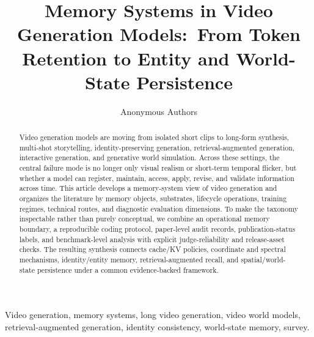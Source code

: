 \documentclass[journal]{IEEEtran}
\title{Memory Systems in Video Generation Models:\ From Token Retention to Entity and World-State Persistence}
\author{Anonymous Authors}
\begin{document}
\maketitle

\begin{abstract}
Video generation models are moving from isolated short clips to long-form synthesis, multi-shot storytelling, identity-preserving generation, retrieval-augmented generation, interactive generation, and generative world simulation. Across these settings, the central failure mode is no longer only visual realism or short-term temporal flicker, but whether a model can register, maintain, access, apply, revise, and validate information across time. This article develops a memory-system view of video generation and organizes the literature by memory objects, substrates, lifecycle operations, training regimes, technical routes, and diagnostic evaluation dimensions. To make the taxonomy inspectable rather than purely conceptual, we combine an operational memory boundary, a reproducible coding protocol, paper-level audit records, publication-status labels, and benchmark-level analysis with explicit judge-reliability and release-asset checks. The resulting synthesis connects cache/KV policies, coordinate and spectral mechanisms, identity/entity memory, retrieval-augmented recall, and spatial/world-state persistence under a common evidence-backed framework.
\end{abstract}

\begin{IEEEkeywords}
Video generation, memory systems, long video generation, video world models, retrieval-augmented generation, identity consistency, world-state memory, survey.
\end{IEEEkeywords}














\appendices




\balance


\end{document}
